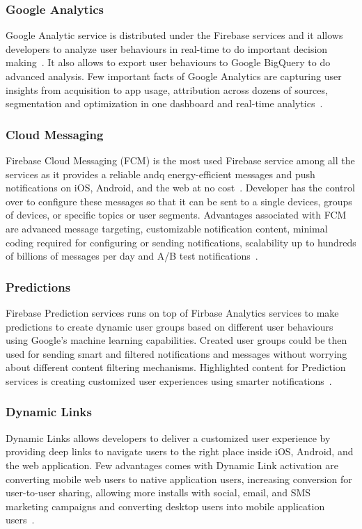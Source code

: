 \subsubsection{Google Analytics} Google Analytic service is
distributed under the Firebase services and it allows developers to
analyze user behaviours in real-time to do important decision
making~\cite{hid-sp18-409-www-firebase}. It also allows to export user
behaviours to Google BigQuery to do advanced analysis. Few important
facts of Google Analytics are capturing user insights from acquisition
to app usage, attribution across dozens of sources, segmentation and
optimization in one dashboard and real-time
analytics~\cite{hid-sp18-409-www-firebase-products}.

\subsubsection{Cloud Messaging} Firebase Cloud Messaging (FCM) is the
most used Firebase service among all the services as it provides a
reliable andq energy-efficient messages and push notifications on iOS,
Android, and the web at no
cost~\cite{hid-sp18-409-www-firebase-products}. Developer has the
control over to configure these messages so that it can be sent to a
single devices, groups of devices, or specific topics or user
segments. Advantages associated with FCM are advanced message
targeting, customizable notification content, minimal coding required
for configuring or sending notifications, scalability up to hundreds
of billions of messages per day and A/B test
notifications~\cite{hid-sp18-409-www-firebase-merged,
  hid-sp18-409-www-firebase-products}.

\subsubsection{Predictions} Firebase Prediction services runs on top
of Firbase Analytics services to make predictions to create dynamic
user groups based on different user behaviours using Google's machine
learning capabilities. Created user groups could be then used for
sending smart and filtered notifications and messages without worrying
about different content filtering mechanisms.  Highlighted content for
Prediction services is creating customized user experiences using
smarter notifications~\cite{hid-sp18-409-www-firebase-products}.

\subsubsection{Dynamic Links} Dynamic Links allows developers to
deliver a customized user experience by providing deep links to
navigate users to the right place inside iOS, Android, and the web
application. Few advantages comes with Dynamic Link activation are
converting mobile web users to native application users, increasing
conversion for user-to-user sharing, allowing more installs with
social, email, and SMS marketing campaigns and converting desktop
users into mobile application
users~\cite{hid-sp18-409-www-firebase-wikipedia,
  hid-sp18-409-www-firebase-products}.

